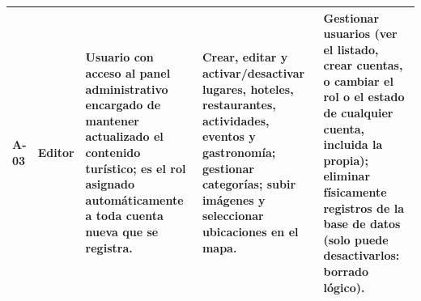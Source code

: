 {\begin{longtable}{|>{\bfseries}p{1.0cm}|>{\bfseries}p{2.1cm}|p{3.2cm}|p{4.3cm}|p{4.1cm}|}
A-03 & Editor &
Usuario con acceso al panel administrativo encargado de mantener actualizado el contenido turístico; es el rol asignado automáticamente a toda cuenta nueva que se registra. &
Crear, editar y activar/desactivar lugares, hoteles, restaurantes, actividades, eventos y gastronomía; gestionar categorías; subir imágenes y seleccionar ubicaciones en el mapa. &
Gestionar usuarios (ver el listado, crear cuentas, o cambiar el rol o el estado de cualquier cuenta, incluida la propia); eliminar físicamente registros de la base de datos (solo puede desactivarlos: borrado lógico). \\ \hline

\end{longtable}
}
